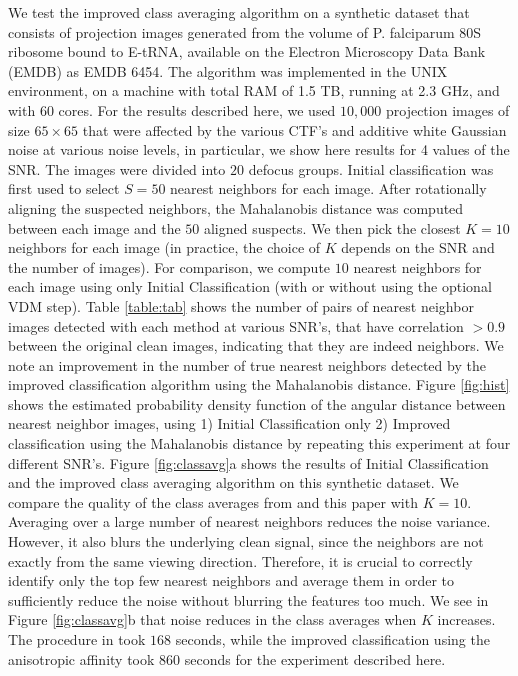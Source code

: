 We test the improved class averaging algorithm on a synthetic dataset that consists of projection images generated from the volume of P. falciparum 80S ribosome bound to E-tRNA, available on the Electron Microscopy Data Bank (EMDB) as EMDB 6454. The algorithm was implemented in the UNIX environment, on a machine with total RAM of 1.5 TB, running at 2.3 GHz, and with 60 cores. 
For the results described here, we used $10,000$ projection images of size $65 \times 65$ that were affected by the various CTF's and additive white Gaussian noise at various noise levels, in particular, we show here results for 4 values of the SNR. The images were divided into $20$ defocus groups. Initial classification was first used to select $S=50$ nearest neighbors for each image. After rotationally aligning the suspected neighbors, the Mahalanobis distance was computed between each image and the $50$ aligned suspects. We then pick the closest $K=10$ neighbors for each image (in practice, the choice of $K$ depends on the SNR and the number of images). For comparison, we compute $10$ nearest neighbors for each image using only Initial Classification (with or without using the optional VDM step). Table \ref{table:tab} shows the number of pairs of nearest neighbor images detected with each method at various SNR's, that have correlation $>0.9$ between the original clean images, indicating that they are indeed neighbors. We note an improvement in the number of true nearest neighbors detected by the improved classification algorithm using the Mahalanobis distance. Figure \ref{fig:hist} shows the estimated probability density function of the angular distance between nearest neighbor images, using 1) Initial Classification only 2) Improved classification using the Mahalanobis distance by repeating this experiment at four different SNR's. Figure \ref{fig:classavg}a shows the results of Initial Classification and the improved class averaging algorithm on this synthetic dataset. We compare the quality of the class averages from \cite{zhao} and this paper with $K=10$. Averaging over a large number of nearest neighbors reduces the noise variance. However, it also blurs the underlying clean signal, since the neighbors are not exactly from the same viewing direction. Therefore, it is crucial to correctly identify only the top few nearest neighbors and average them in order to sufficiently reduce the noise without  blurring the features too much. We see in Figure \ref{fig:classavg}b that noise reduces in the class averages when $K$ increases. The procedure in \cite{zhao} took $168$ seconds, while the improved classification using the anisotropic affinity took $860$ seconds for the experiment described here. 
